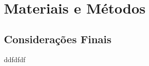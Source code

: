 \chapter{Materiais e Métodos}\label{cap:ferramentas}

\lipsum[43-45]

\section{Considerações Finais}
ddfdfdf
\lipsum[23]

